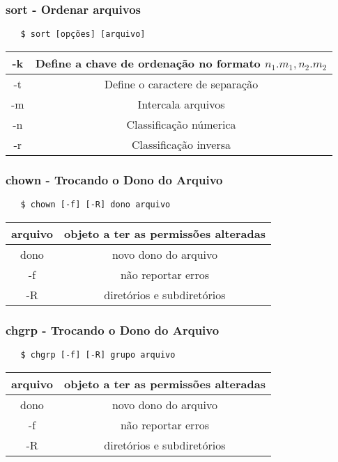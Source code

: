 \documentclass{beamer}
\begin{document}
\begin{frame}[fragile]
   \frametitle{sort - Ordenar arquivos}
   \begin{verbatim}
   $ sort [opções] [arquivo]
   \end{verbatim}
   \begin{table}
      \begin{tabular}{ c | c }
         -k & Define a chave de ordenação no formato $n_{1}.m_{1},n_{2}.m_{2}$ \\
         \hline 
         -t & Define o caractere de separação \\ 
         \hline
         -m & Intercala arquivos \\
         \hline
         -n & Classificação númerica \\
         \hline
         -r & Classificação inversa \\
      \end{tabular}
   \end{table}
\end{frame}

\begin{frame}[fragile]
   \frametitle{chown - Trocando o Dono do Arquivo}
   \begin{verbatim}
   $ chown [-f] [-R] dono arquivo
   \end{verbatim}
   \begin{table}
      \begin{tabular}{ c | c }
         arquivo & objeto a ter as permissões alteradas \\
         \hline 
         dono & novo dono do arquivo \\ 
         \hline
         -f & não reportar erros \\
         \hline
         -R & diretórios e subdiretórios \\
      \end{tabular}
   \end{table}
\end{frame}

\begin{frame}[fragile]
   \frametitle{chgrp - Trocando o Dono do Arquivo}
   \begin{verbatim}
   $ chgrp [-f] [-R] grupo arquivo
   \end{verbatim}
   \begin{table}
      \begin{tabular}{ c | c }
         arquivo & objeto a ter as permissões alteradas \\
         \hline 
         dono & novo dono do arquivo \\ 
         \hline
         -f & não reportar erros \\
         \hline
         -R & diretórios e subdiretórios \\
      \end{tabular}
   \end{table}
\end{frame}
\end{document}
